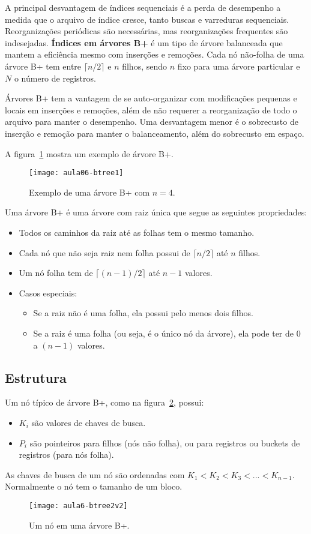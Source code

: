 A principal desvantagem de índices sequenciais é a perda de desempenho
a medida que o arquivo de índice cresce, tanto buscas e varreduras sequenciais.
Reorganizações periódicas são necessárias, mas reorganizações frequentes
são indesejadas.
\textbf{Índices em árvores B+} é um tipo de árvore balanceada que mantem a eficiência
mesmo com inserções e remoções.
Cada nó não-folha de uma árvore B+ tem entre $\lceil n/2 \rceil$ e $n$ filhos,
sendo $n$ fixo para uma árvore particular e $N$ o número de registros.

Árvores B+ tem a vantagem de se auto-organizar com modificações pequenas e
locais em inserções e remoções, além de não requerer a reorganização de todo o
arquivo para manter o desempenho.
Uma desvantagem menor é o sobrecusto de inserção e remoção para manter o 
balanceamento, além do sobrecusto em espaço.

A figura~\ref{aula06:fig:btree1} mostra um exemplo de árvore B+.
%
\begin{figure}[!htb]
\centering
\texttt{[image: aula06-btree1]}
\caption{Exemplo de uma árvore B+ com $n = 4$.}
\label{aula06:fig:btree1}
\end{figure}

Uma árvore B+ é uma árvore com raiz única que segue as seguintes propriedades:
\begin{itemize}
\item Todos os caminhos da raiz até as folhas tem o mesmo tamanho.
\item Cada nó que não seja raiz nem folha possui de $\lceil n/2 \rceil$
até $n$ filhos.
\item Um nó folha tem de $\lceil (n-1)/2 \rceil$ até $n-1$ valores.
\item Casos especiais:
	\begin{itemize}
	\item Se a raiz não é uma folha, ela possui pelo menos dois filhos.
	\item Se a raiz é uma folha (ou seja, é o único nó da árvore), ela
	pode ter de $0$ a $(n-1)$ valores.
	\end{itemize}
\end{itemize}

\subsection{Estrutura}

Um nó típico de árvore B+, como na figura~\ref{aula06:fig:btree2}, possui:
\begin{itemize}
\item $K_i$ são valores de chaves de busca.
\item $P_i$ são pointeiros para filhos (nós não folha), ou para
registros ou buckets de registros (para nós folha).
\end{itemize}
As chaves de busca de um nó são ordenadas com $K_1 < K_2 < K_3 < ... < K_{n-1}$.
Normalmente o nó tem o tamanho de um bloco.
%
\begin{figure}[!htb]
\centering
\texttt{[image: aula6-btree2v2]}
\caption{Um nó em uma árvore B+.}
\label{aula06:fig:btree2}
\end{figure}

